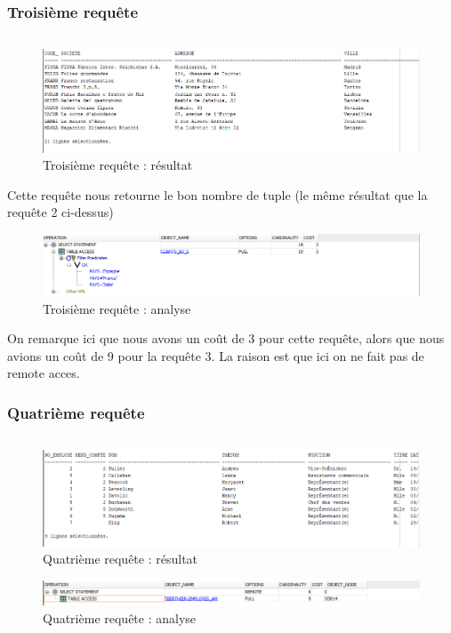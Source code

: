 \documentclass[10pt,a4paper]{article}
\theoremstyle{plain}
\begin{document}
\subsubsection{Troisième requête}
\inputminted{sql}{EUS_IV-A-3.sql}
\begin{figure}[H]
    \centering
    \includegraphics[width=15cm]{EUS_req3.PNG}
    \caption{Troisième requête : résultat}
\end{figure}
Cette requête nous retourne le bon nombre de tuple (le même résultat que la requête 2 ci-dessus)

\begin{figure}[H]
    \centering
    \includegraphics[width=15cm]{EUS_req3_analyse.PNG}
    \caption{Troisième requête : analyse}
\end{figure}
On remarque ici que nous avons un coût de 3 pour cette requête, alors que nous avions un coût de 9 pour la requête 3. La raison est que ici on ne fait pas de remote acces.
\newpage

\subsubsection{Quatrième requête}
\inputminted{sql}{EUS_IV-A-4.sql}
\begin{figure}[H]
    \centering
    \includegraphics[width=15cm]{EUS_req4.PNG}
    \caption{Quatrième requête : résultat}
\end{figure}

\begin{figure}[H]
    \centering
    \includegraphics[width=15cm]{EUS_req4_analyse.PNG}
    \caption{Quatrième requête : analyse}
\end{figure}
\newpage
\end{document}
